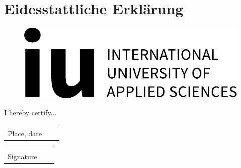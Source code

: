 \chapter*{Eidesstattliche Erklärung}

\begin{figure}[t!]
    \raggedleft
    \includegraphics[scale=0.3]{pics/logo.pdf}
\end{figure}

\thispagestyle{empty} %

I hereby certify...


\vspace{1,5 cm} 
\begin{tabular}{p{7cm}p{.5cm}l}
\dotfill \\ 
Place, date
\end{tabular}%
\hfill 
\begin{tabular}{p{7cm}p{.5cm}l}
\dotfill \\ 
Signature
\end{tabular}%